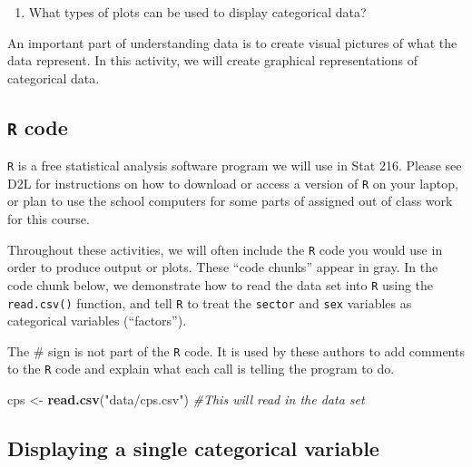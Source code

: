 \documentclass[
]{report}
\newenvironment{Shaded}{\begin{snugshade}}{\end{snugshade}}
\newcommand{\CommentTok}[1]{\textcolor[rgb]{0.56,0.35,0.01}{\textit{#1}}}
\newcommand{\KeywordTok}[1]{\textcolor[rgb]{0.13,0.29,0.53}{\textbf{#1}}}
\newcommand{\NormalTok}[1]{#1}
\newcommand{\StringTok}[1]{\textcolor[rgb]{0.31,0.60,0.02}{#1}}
\providecommand{\tightlist}{%
  \setlength{\itemsep}{0pt}\setlength{\parskip}{0pt}}
\begin{document}
\vspace{0.4in}

\begin{enumerate}
\def\labelenumi{\arabic{enumi}.}
\setcounter{enumi}{2}
\tightlist
\item
  What types of plots can be used to display categorical data?
\end{enumerate}

\vspace{0.5in}

An important part of understanding data is to create visual pictures of what the data represent. In this activity, we will create graphical representations of categorical data.

\hypertarget{r-code}{%
\subsection*{\texorpdfstring{\texttt{R} code}{R code}}\label{r-code}}

\texttt{R} is a free statistical analysis software program we will use in Stat 216. Please see D2L for instructions on how to download or
access a version of \texttt{R} on your laptop, or plan to use the school computers for some parts of assigned out of class work for this course.

Throughout these activities, we will often include the \texttt{R} code
you would use in order to produce output or plots. These
``code chunks'' appear in gray. In the code chunk below, we
demonstrate how to read the data set into \texttt{R} using the \texttt{read.csv()} function, and tell \texttt{R} to treat the \texttt{sector} and \texttt{sex} variables as categorical variables (``factors'').

The \# sign is not part of the \texttt{R} code.
It is used by these authors to add comments to the \texttt{R} code and explain what each call is telling the program to do.

\begin{Shaded}
\begin{Highlighting}[]
\NormalTok{cps \textless{}{-}}\StringTok{ }\KeywordTok{read.csv}\NormalTok{(}\StringTok{"data/cps.csv"}\NormalTok{) }\CommentTok{\#This will read in the data set}
\end{Highlighting}
\end{Shaded}

\hypertarget{displaying-a-single-categorical-variable}{%
\subsection*{Displaying a single categorical variable}\label{displaying-a-single-categorical-variable}}
\end{document}
